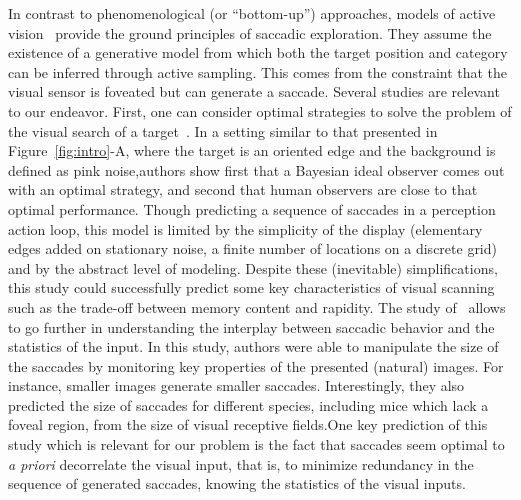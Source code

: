 In contrast to phenomenological (or ``bottom-up'') approaches, models of active vision~\citep{Najemnik05,Butko2010infomax,Friston12} provide the ground principles of saccadic exploration. They assume the existence of a generative model from which both the target position and category can be inferred through active sampling. This comes from the constraint that the visual sensor is foveated but can generate a saccade. 
Several studies are relevant to our endeavor. First, one can consider optimal strategies to solve the problem of the visual search of a target~\citep{Najemnik05}. In a setting similar to that presented in Figure~\ref{fig:intro}-A, \ICANN where the target is an oriented edge and the background is defined as pink noise,\fi authors show first that a Bayesian ideal observer comes out with an optimal strategy, and second that human observers are close to that optimal performance. \ICANN Though predicting a sequence of saccades in a perception action loop, this model is limited by the simplicity of the display (elementary edges added on stationary noise, a finite number of locations on a discrete grid) and by the abstract level of modeling. Despite these (inevitable) simplifications, this study could successfully predict some key characteristics of visual scanning such as the trade-off between memory content and rapidity.
\fi
The study of~\citep{Samonds18} allows to go further in understanding the interplay between saccadic behavior and the statistics of the input. \ICANN In this study, authors were able to manipulate the size of the saccades by monitoring key properties of the presented (natural) images. For instance, smaller images generate smaller saccades. Interestingly, they also predicted the size of saccades for different species, including mice which lack a foveal region, from the size of visual receptive fields.\fi One key prediction of this study which is relevant for our problem is the fact that saccades seem optimal to \emph{a priori} decorrelate the visual input, that is, to minimize redundancy in the sequence of generated saccades, knowing the statistics of the visual inputs.

